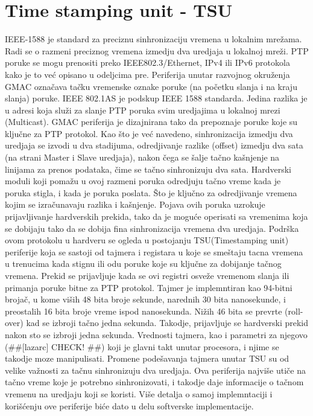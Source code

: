 \documentclass[a4paper,12pt, master]{etf}
\begin{document}
	\section{Time stamping unit - TSU}
	IEEE-1588 je standard za preciznu sinhronizaciju vremena u lokalnim mre\v{z}ama. Radi se o
	razmeni	preciznog vremena izmedju dva uredjaja u lokalnoj mre\v{z}i. PTP poruke se mogu
	prenositi preko	IEEE802.3/Ethernet, IPv4 ili IPv6 protokola kako je to ve\'{c} opisano u
	odeljcima pre. Periferija unutar razvojnog okru\v{z}enja GMAC ozna\v{c}ava ta\v{c}ku
	vremenske oznake poruke (na po\v{c}etku slanja i na kraju slanja) poruke. IEEE 802.1AS je
	podskup IEEE 1588 standarda. Jedina razlika je u adresi koja slu\v{z}i za slanje PTP poruka
	svim uredjajima u lokalnoj mrezi (Multicast). GMAC periferija je dizajnirana tako da
	prepoznaje poruke koje su klju\v{c}ne za PTP protokol. Kao \v{s}to je ve\'{c} navedeno,
	sinhronizacija izmedju dva uredjaja se izvodi u dva stadijuma, odredjivanje razlike	(offset)
	izmedju dva sata (na strani Master i Slave uredjaja), nakon \v{c}ega se \v{s}alje ta\v{c}no
	ka\v{s}njenje na linijama za prenos podataka, \v{c}ime se ta\v{c}no sinhronizuju dva sata.
	Hardverski moduli koji poma\v{z}u u ovoj razmeni poruka odredjuju ta\v{c}no vreme kada je
	poruka stigla, i kada je poruka poslata. \v{S}to je klju\v{c}no za odredjivanje vremena
	kojim se izra\v{c}unavaju razlika i ka\v{s}njenje. Pojava ovih poruka uzrokuje
	prijavljivanje hardverskih prekida, tako da je mogu\'{c}e operisati sa vremenima koja se
	dobijaju tako da se dobija fina sinhronizacija vremena dva uredjaja. Podr\v{s}ka ovom
	protokolu u hardveru se ogleda u postojanju TSU(Timestamping unit) periferije
	koja se sastoji od tajmera i registara u koje se sme\v{s}taju tacna vremena u trenucima kada
	stignu ili odu poruke koje su klju\v{c}ne za dobijanje ta\v{c}nog vremena. Prekid se
	prijavljuje kada se ovi	registri osve\v{z}e vremenom slanja ili primanja poruke bitne za PTP
	protokol. Tajmer je implemntiran kao 94-bitni broja\v{c}, u kome vi\v{s}ih 48 bita broje
	sekunde, narednih 30 bita nanosekunde, i preostalih 16 bita broje vreme ispod nanosekunda.
	Ni\v{z}ih 46 bita se prevrte (roll-over) kad se izbroji ta\v{c}no jedna sekunda. Takodje,
	prijavljuje se hardverski prekid nakon sto se izbroji jedna sekunda. Vrednosti tajmera, kao
	i parametri za njegovo (\#\#[lazarc] CHECK! \#\#) koji je glavni takt unutar procesora, i njime
	se takodje moze manipulisati. Promene pode\v{s}avanja tajmera unutar TSU su od velike
	va\v{z}nosti za ta\v{c}nu sinhronizuju dva uredjaja. Ova periferija najvi\v{s}e uti\v{c}e na
	ta\v{c}no vreme koje je potrebno sinhronizovati, i takodje daje informacije o ta\v{c}nom
	vremenu na uredjaju koji se koristi. Vi\v{s}e detalja o samoj implemntaciji i
	kori\v{s}\'{c}enju ove periferije bi\'{c}e dato u delu softverske implementacije.
\end{document}
